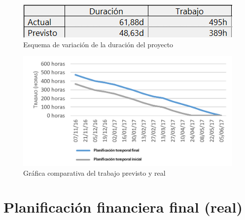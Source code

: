 \documentclass{pclass}
\begin{document}
\begin{figure}[H]
	\centering
	\includegraphics[width=1\textwidth]{img/variacionDuracion}
	\caption{Esquema de variación de la duración del proyecto}
	\label{fig:variacionDuracion}
\end{figure}

\begin{figure}[H]
	\centering
	\includegraphics[width=1\textwidth]{img/graficaComparativaTiempo}
	\caption{Gráfica comparativa del trabajo previsto y real}
	\label{fig:graficaComparativa}
\end{figure}


\clearpage
\section{Planificación financiera final (real)} 
\end{document}
